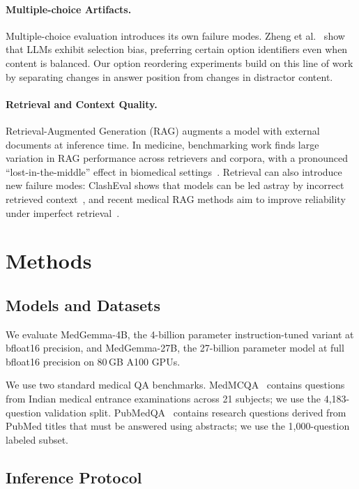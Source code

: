 \documentclass[runningheads,a4paper]{llncs}
\begin{document}
\paragraph{Multiple-choice Artifacts.}
Multiple-choice evaluation introduces its own failure modes. Zheng et al.~\cite{zheng2024llm} show that LLMs exhibit selection bias, preferring certain option identifiers even when content is balanced. Our option reordering experiments build on this line of work by separating changes in answer position from changes in distractor content.

\paragraph{Retrieval and Context Quality.}
Retrieval-Augmented Generation (RAG) augments a model with external documents at inference time. In medicine, benchmarking work finds large variation in RAG performance across retrievers and corpora, with a pronounced ``lost-in-the-middle'' effect in biomedical settings~\cite{xiong2024benchmarking,liu2024lost}. Retrieval can also introduce new failure modes: ClashEval shows that models can be led astray by incorrect retrieved context~\cite{wu2024clasheval}, and recent medical RAG methods aim to improve reliability under imperfect retrieval~\cite{sohn2024rag2,barnett2024rag}.

\section{Methods}

\subsection{Models and Datasets}

We evaluate MedGemma-4B, the 4-billion parameter instruction-tuned variant at bfloat16 precision, and MedGemma-27B, the 27-billion parameter model at full bfloat16 precision on 80\,GB A100 GPUs.

We use two standard medical QA benchmarks. MedMCQA~\cite{pal2022medmcqa} contains questions from Indian medical entrance examinations across 21 subjects; we use the 4,183-question validation split. PubMedQA~\cite{jin2019pubmedqa} contains research questions derived from PubMed titles that must be answered using abstracts; we use the 1,000-question labeled subset.

\subsection{Inference Protocol}
\end{document}
